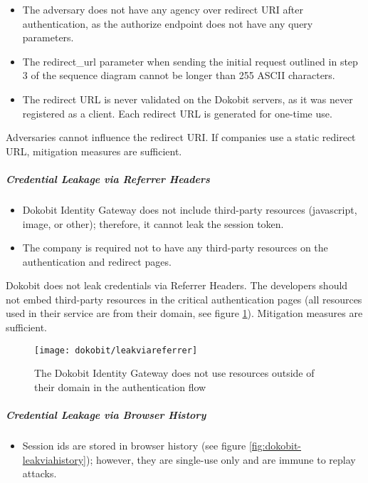 \begin{itemize}
  \item The adversary does not have any agency over redirect URI after authentication, as the {authorize} endpoint does not have any query parameters.
  \item The redirect\_url parameter when sending the initial request outlined in step 3 of the sequence diagram cannot be longer than 255 ASCII characters.
  \item The redirect URL is never validated on the Dokobit servers, as it was never registered as a client. Each redirect URL is generated for one-time use.
\end{itemize}

Adversaries cannot influence the redirect URI. If companies use a static redirect URL, mitigation measures are sufficient.

\subparagraph{Credential Leakage via Referrer Headers}

\begin{itemize}
  \item Dokobit Identity Gateway does not include third-party resources (javascript, image, or other); therefore, it cannot leak the session token.
  \item The company is required not to have any third-party resources on the authentication and redirect pages.
\end{itemize}

Dokobit does not leak credentials via Referrer Headers. The developers should not embed third-party resources in the critical authentication pages (all resources used in their service are from their domain, see figure \ref{fig:dokobit-leakviareferrer}). Mitigation measures are sufficient.

\begin{figure}
  \centering
  \texttt{[image: dokobit/leakviareferrer]}
  \caption{The Dokobit Identity Gateway does not use resources outside of their domain in the authentication flow}
  \label{fig:dokobit-leakviareferrer}
\end{figure}

\subparagraph{Credential Leakage via Browser History}

\begin{itemize}
  \item Session ids are stored in browser history (see figure \ref{fig:dokobit-leakviahistory}); however, they are single-use only and are immune to replay attacks.
\end{itemize}

